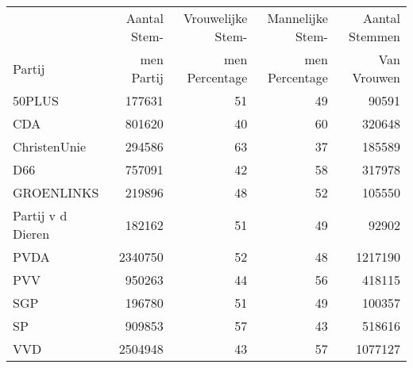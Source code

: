 \begin{tabular}{lrrrr} 
\toprule 
{} &  Aantal Stem-  &  Vrouwelijke Stem- &  Mannelijke Stem-  &  Aantal Stemmen  \\
Partij                &        men Partij              &                                men Percentage &            men Percentage                  &    Van Vrouwen                         \\
\midrule
50PLUS                &                 177631 &                              51 &                             49 &                       90591 \\
CDA                   &                 801620 &                              40 &                             60 &                      320648 \\
ChristenUnie          &                 294586 &                              63 &                             37 &                      185589 \\
D66                   &                 757091 &                              42 &                             58 &                      317978 \\
GROENLINKS            &                 219896 &                              48 &                             52 &                      105550 \\
Partij v d Dieren &                 182162 &                              51 &                             49 &                       92902 \\
PVDA                  &                2340750 &                              52 &                             48 &                     1217190 \\
PVV                   &                 950263 &                              44 &                             56 &                      418115 \\
SGP                   &                 196780 &                              51 &                             49 &                      100357 \\
SP                    &                 909853 &                              57 &                             43 &                      518616 \\
VVD                   &                2504948 &                              43 &                             57 &                     1077127 \\
\bottomrule
\end{tabular}
